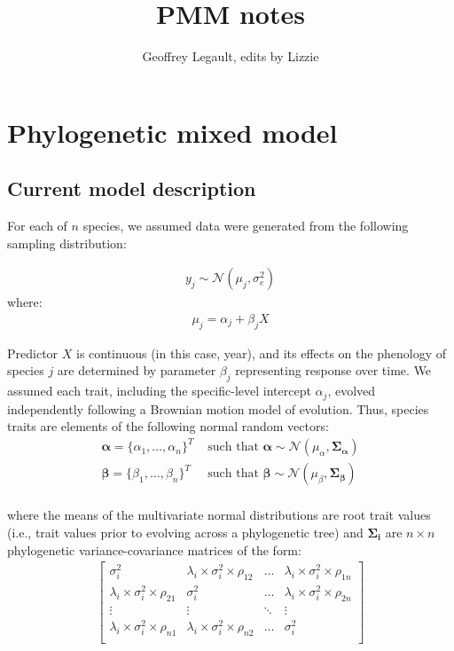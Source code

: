 \documentclass[12pt,a4paper]{article}
\title{PMM notes}
\author{Geoffrey Legault, edits by Lizzie}
\begin{document}
\section*{Phylogenetic mixed model}

\subsection*{Current model description}

For each of $n$ species, we assumed data were generated from the following sampling distribution:

\begin{align}
  \label{modely}
  y_j \sim \mathcal{N}(\mu_j, \sigma_e^2)
\end{align}
where:
\begin{align}
  \label{modelmu}
  \mu_j = \alpha_j + \beta_{j} X
\end{align}

Predictor $X$ is continuous (in this case, year), and its effects on the phenology of species $j$ are determined by parameter $\beta_{j}$ representing response over time. We assumed each trait, including the specific-level intercept $\alpha_j$, evolved independently following a Brownian motion model of evolution. Thus, species traits are elements of the following normal random vectors:
\begin{align}
  \boldsymbol{\alpha} = \{\alpha_1, \ldots, \alpha_n\}^T & \text{ such that }
  \boldsymbol{\alpha} \sim \mathcal{N}(\mu_{\alpha},\boldsymbol{\Sigma_{\alpha}}) \\
  \boldsymbol{\beta} =  \{\beta_{1}, \ldots, \beta_{n}\}^T & \text{ such that }
  \boldsymbol{\beta} \sim \mathcal{N}(\mu_{\beta},\boldsymbol{\Sigma_{\beta}}) \nonumber \\
\end{align}

\noindent where the means of the multivariate normal distributions are root trait values (i.e., trait values prior to evolving across a phylogenetic tree) and $\boldsymbol{\Sigma_i}$ are $n \times n$ phylogenetic variance-covariance matrices of the form: \\

\begin{align}
  \label{phymat}
\begin{bmatrix}
  \sigma^2_i & \lambda_i \times \sigma^2_{i} \times \rho_{12} & \ldots & \lambda_i \times \sigma^2_{i} \times \rho_{1n} \\
  \lambda_i \times \sigma^2_i \times \rho_{21} & \sigma^2_i & \ldots & \lambda_i \times \sigma^2_{i} \times \rho_{2n} \\
  \vdots & \vdots & \ddots & \vdots \\
  \lambda_i \times \sigma^2_i \times \rho_{n1} & \lambda_i \times \sigma^2_i \times \rho_{n2} & \ldots & \sigma^2_i \\
\end{bmatrix}
\end{align}
\end{document}
